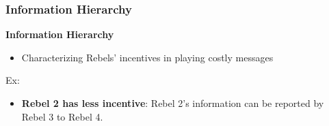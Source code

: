 \documentclass[9pt]{beamer}
\begin{document}
\begin{frame}
   \frametitle{Information Hierarchy}


\textbf{Information Hierarchy}
\begin{itemize}
\item {Characterizing Rebels' incentives in playing costly messages}\hyperlink{alt_IH}{}
\end{itemize}

Ex: 
\begin{center}
\end{center}

\pause
\begin{itemize}
\item \textbf{Rebel 2 has less incentive}: Rebel 2's information can be reported by Rebel 3 to Rebel 4.
\end{itemize}



\end{frame}
\end{document}
